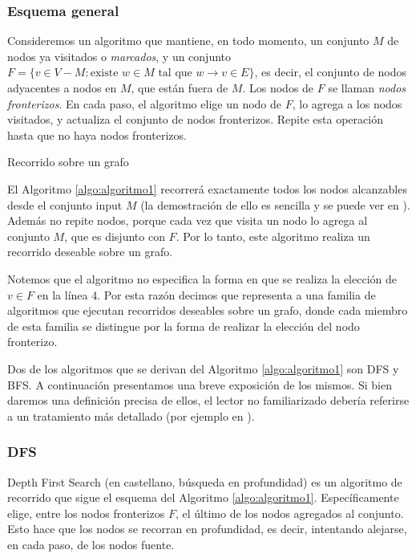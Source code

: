 \subsubsection{Esquema general}
\label{subsubsec:esquema}
Consideremos un algoritmo que mantiene, en todo momento, un conjunto $M$ de nodos ya visitados o \textit{marcados}, y un conjunto $F = \{v \in V - M : \text{existe }w\in M\text{ tal que }w \to v \in E\}$, es decir, el conjunto de nodos adyacentes a nodos en $M$, que están fuera de $M$. Los nodos de $F$ se llaman \textit{nodos fronterizos}. En cada paso, el algoritmo elige un nodo de $F$, lo agrega a los nodos visitados, y actualiza el conjunto de nodos fronterizos. Repite esta operación hasta que no haya nodos fronterizos.

\begin{algorithm}
	\DontPrintSemicolon
 	\BlankLine
\caption{Recorrido sobre un grafo}
\label{algo:algoritmo1}
\end{algorithm}

El Algoritmo \ref{algo:algoritmo1} recorrerá exactamente todos los nodos alcanzables desde el conjunto input $M$ (la demostración de ello es sencilla y se puede ver en \cite{gross06}). Además no repite nodos, porque cada vez que visita un nodo lo agrega al conjunto $M$, que es disjunto con $F$. Por lo tanto, este algoritmo realiza un recorrido deseable sobre un grafo.

Notemos que el algoritmo no especifica la forma en que se realiza la elección de $v \in F$ en la línea 4. Por esta razón decimos que representa a una familia de algoritmos que ejecutan recorridos deseables sobre un grafo, donde cada miembro de esta familia se distingue por la forma de realizar la elección del nodo fronterizo.

Dos de los algoritmos que se derivan del Algoritmo \ref{algo:algoritmo1} son DFS y BFS. A continuación presentamos una breve exposición de los mismos. Si bien daremos una definición precisa de ellos, el lector no familiarizado debería referirse a un tratamiento más detallado (por ejemplo en \cite{cormen01}).

\subsubsection{DFS}
Depth First Search (en castellano, búsqueda en profundidad) es un algoritmo de recorrido que sigue el esquema del Algoritmo \ref{algo:algoritmo1}. Específicamente elige, entre los nodos fronterizos $F$, el último de los nodos agregados al conjunto. Esto hace que los nodos se recorran en profundidad, es decir, intentando alejarse, en cada paso, de los nodos fuente.

